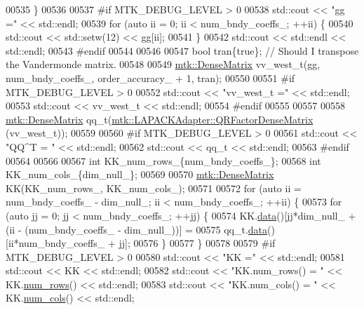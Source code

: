 \begin{DoxyCode}
{{00535   \}
00536 
00537 \textcolor{preprocessor}{  #if MTK\_DEBUG\_LEVEL > 0}
00538   std::cout << \textcolor{stringliteral}{"gg ="} << std::endl;
00539   \textcolor{keywordflow}{for} (\textcolor{keyword}{auto} ii = 0; ii < num\_bndy\_coeffs\_; ++ii) \{
00540     std::cout << std::setw(12) << gg[ii];
00541   \}
00542   std::cout << std::endl << std::endl;
00543 \textcolor{preprocessor}{  #endif}
00544 
00546 
00547   \textcolor{keywordtype}{bool} tran\{\textcolor{keyword}{true}\}; \textcolor{comment}{// Should I transpose the Vandermonde matrix.}
00548 
00549   \hyperlink{classmtk_1_1DenseMatrix}{mtk::DenseMatrix} vv\_west\_t(gg, num\_bndy\_coeffs\_, order\_accuracy\_ + 1, tran);
00550 
00551 \textcolor{preprocessor}{  #if MTK\_DEBUG\_LEVEL > 0}
00552   std::cout << \textcolor{stringliteral}{"vv\_west\_t ="} << std::endl;
00553   std::cout << vv\_west\_t << std::endl;
00554 \textcolor{preprocessor}{  #endif}
00555 
00557 
00558   \hyperlink{classmtk_1_1DenseMatrix}{mtk::DenseMatrix} qq\_t(\hyperlink{classmtk_1_1LAPACKAdapter_ae5c6e78c9c819c9ac7a6f31bfd011d7a}{mtk::LAPACKAdapter::QRFactorDenseMatrix}
      (vv\_west\_t));
00559 
00560 \textcolor{preprocessor}{  #if MTK\_DEBUG\_LEVEL > 0}
00561   std::cout << \textcolor{stringliteral}{"QQ^T = "} << std::endl;
00562   std::cout << qq\_t << std::endl;
00563 \textcolor{preprocessor}{  #endif}
00564 
00566 
00567   \textcolor{keywordtype}{int} KK\_num\_rows\_\{num\_bndy\_coeffs\_\};
00568   \textcolor{keywordtype}{int} KK\_num\_cols\_\{dim\_null\_\};
00569 
00570   \hyperlink{classmtk_1_1DenseMatrix}{mtk::DenseMatrix} KK(KK\_num\_rows\_, KK\_num\_cols\_);
00571 
00572   \textcolor{keywordflow}{for} (\textcolor{keyword}{auto} ii = num\_bndy\_coeffs\_ - dim\_null\_; ii < num\_bndy\_coeffs\_; ++ii) \{
00573     \textcolor{keywordflow}{for} (\textcolor{keyword}{auto} jj = 0; jj < num\_bndy\_coeffs\_; ++jj) \{
00574       KK.\hyperlink{classmtk_1_1DenseMatrix_a0c33b8a9e01d157c61ddbdf807c25d84}{data}()[jj*dim\_null\_ + (ii - (num\_bndy\_coeffs\_ - dim\_null\_))] =
00575           qq\_t.\hyperlink{classmtk_1_1DenseMatrix_a0c33b8a9e01d157c61ddbdf807c25d84}{data}()[ii*num\_bndy\_coeffs\_ + jj];
00576     \}
00577   \}
00578 
00579 \textcolor{preprocessor}{  #if MTK\_DEBUG\_LEVEL > 0}
00580   std::cout << \textcolor{stringliteral}{"KK ="} << std::endl;
00581   std::cout << KK << std::endl;
00582   std::cout << \textcolor{stringliteral}{"KK.num\_rows() = "} << KK.\hyperlink{classmtk_1_1DenseMatrix_a53f3afb3b6a8d21854458aaa9663cc74}{num\_rows}() << std::endl;
00583   std::cout << \textcolor{stringliteral}{"KK.num\_cols() = "} << KK.\hyperlink{classmtk_1_1DenseMatrix_a41747502d468c6728a4be31501b16e0e}{num\_cols}() << std::endl;
}}
\end{DoxyCode}
